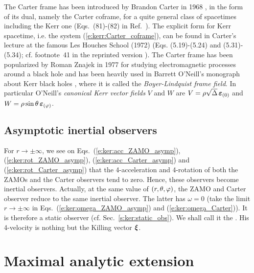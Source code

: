 \begin{hist}
The Carter frame has been introduced by Brandon Carter in 1968 \cite{Carte68b}, in
the form of its dual, namely the Carter coframe, for a quite general class of spacetimes including the Kerr one
(Eqs.~(81)-(82) in Ref.~\cite{Carte68b}). The explicit form for Kerr spacetime, i.e. the system
(\ref{e:kerr:Carter_coframe}), can be found in Carter's lecture at the famous Les Houches School (1972) \cite{Carte73a} (Eqs. (5.19)-(5.24) and (5.31)-(5.34); cf. footnote~41 in the reprinted version \cite{Carte73a}).
The Carter frame has been popularized by Roman Znajek in 1977 \cite{Znaje77} for
studying electromagnetic processes around a black hole and has been heavily used in
Barrett O'Neill's monograph about Kerr black holes \cite{ONeil95}, where it is called the
\emph{Boyer-Lindquist frame field}. In particular O'Neill's \emph{canonical Kerr vector fields} $V$
and $W$ are $V= \rho\sqrt{\Delta} \, \bm{\varepsilon}_{(0)}$ and
$W = \rho\sin\theta \, \bm{\varepsilon}_{(\varphi)}$.
\end{hist}

\subsection{Asymptotic inertial observers} \label{s:ker:asymp_inertial_obs}

For $r\to\pm\infty$, we see on Eqs.~(\ref{e:ker:acc_ZAMO_asymp}), (\ref{e:ker:rot_ZAMO_asymp}),
(\ref{e:ker:acc_Carter_asymp}) and (\ref{e:ker:rot_Carter_asymp}) that the 4-acceleration
and 4-rotation of both the ZAMOs and the Carter observers tend to zero. Hence, these observers
become inertial observers.
Actually, at the same value of $(r,\theta,\varphi)$,
the ZAMO and Carter observer reduce to the same inertial observer. The latter has $\omega=0$
(take the limit $r\to\pm\infty$ in Eqs.~(\ref{e:ker:omega_ZAMO_asymp}) and (\ref{e:ker:omega_Carter})).
It is therefore a static observer (cf. Sec.~\ref{s:ker:static_obs}). We shall call it the
. His 4-velocity is nothing but the Killing vector $\bm{\xi}$.




\section{Maximal analytic extension} \label{s:ker:max_extension}

